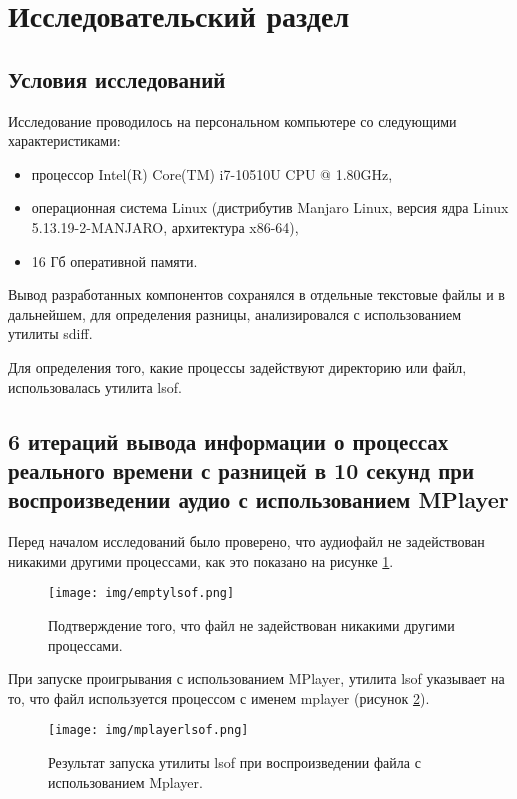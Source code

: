 \section{Исследовательский раздел}
\subsection{Условия исследований}
Исследование проводилось на персональном компьютере со следующими характеристиками:

\begin{itemize}
\item процессор Intel(R) Core(TM) i7-10510U CPU @ 1.80GHz,
\item операционная система Linux (дистрибутив Manjaro Linux, версия ядра Linux 5.13.19-2-MANJARO, архитектура x86-64),
\item 16 Гб оперативной памяти.
\end{itemize}

Вывод разработанных компонентов сохранялся в отдельные текстовые файлы и в дальнейшем, для определения разницы, анализировался с использованием утилиты sdiff.

Для определения того, какие процессы задействуют директорию или файл, использовалась утилита lsof.

\subsection{6 итераций вывода информации о процессах реального времени с разницей в 10 секунд при воспроизведении аудио с использованием MPlayer}
Перед началом исследований было проверено, что аудиофайл не задействован никакими другими процессами, как это показано на рисунке \ref{fig:emptylsof}.

\begin{figure}[H]
	\centering
	\texttt{[image: img/emptylsof.png]}
	\caption{Подтверждение того, что файл не задействован никакими другими процессами.}
	\label{fig:emptylsof}
\end{figure}

При запуске проигрывания с использованием MPlayer, утилита lsof указывает на то, что файл используется процессом с именем mplayer (рисунок \ref{fig:mplayerlsof}).

\begin{figure}[H]
	\centering
	\texttt{[image: img/mplayerlsof.png]}
	\caption{Результат запуска утилиты lsof при воспроизведении файла с использованием Mplayer.}
	\label{fig:mplayerlsof}
\end{figure}

